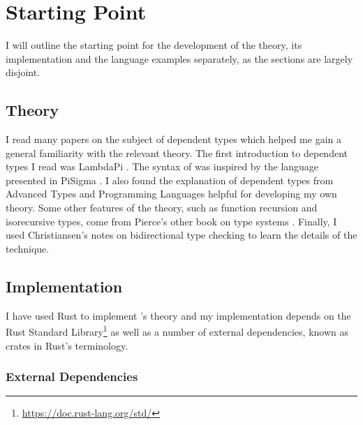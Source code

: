 \documentclass[12pt,a4paper,twoside]{report}
\begin{document}
\section{Starting Point}

I will outline the starting point for the development of the theory, its implementation and the language examples separately, as the sections are largely disjoint.

\subsection{Theory}

I read many papers on the subject of dependent types which helped me gain a general familiarity with the relevant theory.
The first introduction to dependent types I read was LambdaPi \cite{loeh10}.
The syntax of \pimu{} was inspired by the language presented in PiSigma \cite{thorsten10}.
I also found the explanation of dependent types from Advanced Types and Programming Languages \cite{aspinall04} helpful for developing my own theory.
Some other features of the theory, such as function recursion and isorecursive types, come from Pierce's other book on type systems \cite{pierce02}.
Finally, I used Christiansen's notes on bidirectional type checking \cite{christiansen13} to learn the details of the technique.

\subsection{Implementation}

I have used Rust to implement \pimu{}'s theory and my implementation depends on the Rust Standard Library\footnote{\url{https://doc.rust-lang.org/std/}} as well as a number of external dependencies, known as crates in Rust's terminology.

\subsubsection{External Dependencies}
\end{document}
